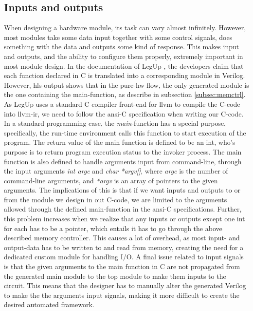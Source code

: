 \subsection{\label{subsec:inoutprobs}Inputs and outputs}
When designing a hardware module, its task can vary almost infinitely. However, most modules take some data input together with some control signals, does something with the data and outputs some kind of response. This makes input and outputs, and the ability to configure them properly, extremely important in most module design. In the documentation of LegUp \cite{leguparch}, the developers claim that each function declared in C is translated into a corresponding module in Verilog. However, \gls{hls}-output shows that in the pure-\gls{hw} flow, the only generated module is the one containing the main-function, as describe in subsection \ref{subsec:memctrl}. As LegUp uses a standard C compiler front-end for \gls{llvm} to compile the C-code into \gls{llvm}-\gls{ir}, we need to follow the \gls{ansi}-C specification \cite{isoc} when writing our C-code. In a standard programming case, the \textit{main}-function has a special purpose, specifically, the run-time environment calls this function to start execution of the program. The return value of the main function is defined to be an int, who's purpose is to return program execution status to the invoker process. The main function is also defined to handle arguments input from command-line, through the input arguments \textit{int argc} and \textit{char *argv[]}, where \textit{argc} is the number of command-line arguments, and \textit{*argv} is an array of pointers to the given arguments. The implications of this is that if we want inputs and outputs to or from the module we design in out C-code, we are limited to the arguments allowed through the defined main-function in the \gls{ansi}-C specifications. Further, this problem increases when we realize that any inputs or outputs except one int for each has to be a pointer, which entails it has to go through the above described memory controller. This causes a lot of overhead, as most input- and output-data has to be written to and read from memory, creating the need for a dedicated custom module for handling I/O. A final issue related to input signals is that the given arguments to the main function in C are not propagated from the generated main module to the top module to make them inputs to the circuit. This means that the designer has to manually alter the generated Verilog to make the the arguments input signals, making it more difficult to create the desired automated framework.
